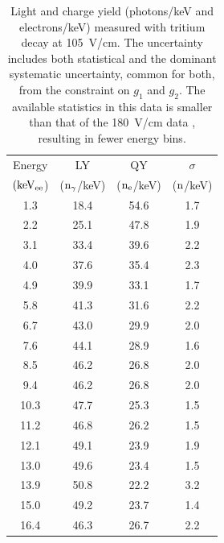 \begin{table}[h!]
\centering
\caption{Light and charge yield (photons/keV and electrons/keV) measured with tritium decay at 105~V/cm. The uncertainty includes both statistical and the dominant systematic uncertainty, common for both, from the constraint on $g_1$ and $g_2$. The available statistics in this data is smaller than that of the 180~V/cm data , resulting in fewer energy bins.}
\begin{tabular}{|c|c|c|c|} \hline
Energy 	& 		LY	& 	QY	& $\sigma$ \\ 
$\rm (keV_{ee}$) & ($\rm n_\gamma$/keV)   & ($\rm n_e$/keV) & ($\rm n$/keV) \\ \hline
1.3 	 & 18.4 	 & 54.6 	 & 1.7 	 \\ \hline 
2.2 	 & 25.1 	 & 47.8 	 & 1.9 	 \\ \hline 
3.1 	 & 33.4 	 & 39.6 	 & 2.2 	 \\ \hline 
4.0 	 & 37.6 	 & 35.4 	 & 2.3 	 \\ \hline 
4.9 	 & 39.9 	 & 33.1 	 & 1.7 	 \\ \hline 
5.8 	 & 41.3 	 & 31.6 	 & 2.2 	 \\ \hline 
6.7 	 & 43.0 	 & 29.9 	 & 2.0 	 \\ \hline 
7.6 	 & 44.1 	 & 28.9 	 & 1.6 	 \\ \hline 
8.5 	 & 46.2 	 & 26.8 	 & 2.0 	 \\ \hline 
9.4 	 & 46.2 	 & 26.8 	 & 2.0 	 \\ \hline 
10.3 	 & 47.7 	 & 25.3 	 & 1.5 	 \\ \hline 
11.2 	 & 46.8 	 & 26.2 	 & 1.5 	 \\ \hline 
12.1 	 & 49.1 	 & 23.9 	 & 1.9 	 \\ \hline 
13.0 	 & 49.6 	 & 23.4 	 & 1.5 	 \\ \hline 
13.9 	 & 50.8 	 & 22.2 	 & 3.2 	 \\ \hline 
15.0 	 & 49.2 	 & 23.7 	 & 1.4 	 \\ \hline 
16.4 	 & 46.3 	 & 26.7 	 & 2.2 	 \\ \hline 
\end{tabular}
\label{table:Yields_100}
\end{table}



